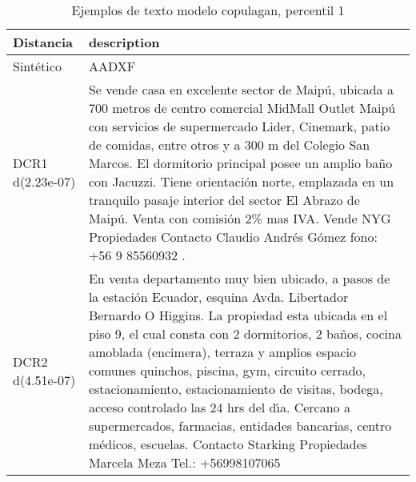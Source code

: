 \begin{table}[H]
\centering
\fontsize{10}{14}\selectfont
\caption{Ejemplos de texto modelo copulagan, percentil 1}
\label{table-example-economicos-a-1-copulagan-1p-text}
\begin{tabular}{|l|m{35em}|}
\hline
\rowcolor[gray]{0.8}
Distancia & description \\
\hline Sintético & AADXF \\
\hline DCR1 d(2.23e-07) & Se vende casa en excelente sector de Maip\'u, ubicada a 700 metros de centro comercial MidMall Outlet Maip\'u con servicios de supermercado Lider, Cinemark, patio de comidas, entre otros  y a 300 m del Colegio San Marcos. 
El dormitorio principal  posee un amplio ba\~no con Jacuzzi.  
Tiene orientaci\'on norte, emplazada en un tranquilo pasaje interior del sector El Abrazo de Maip\'u.
Venta con comisi\'on 2\% mas IVA.
Vende NYG Propiedades 
Contacto Claudio Andr\'es G\'omez
fono: +56 9 85560932
. \\
\hline DCR2 d(4.51e-07) & En venta departamento muy bien ubicado, a pasos de la estaci\'on Ecuador, esquina Avda. Libertador Bernardo O Higgins. La propiedad esta ubicada en el piso 9, el cual consta con 2 dormitorios, 2 ba\~nos, cocina amoblada (encimera), terraza y amplios espacio comunes quinchos, piscina, gym, circuito cerrado, estacionamiento, estacionamiento de visitas, bodega, acceso controlado las 24 hrs del d{\'\i}a. Cercano a supermercados, farmacias, entidades bancarias, centro m\'edicos, escuelas.  Contacto Starking Propiedades Marcela Meza Tel.: +56998107065 \\
\hline
\end{tabular}
\end{table}
